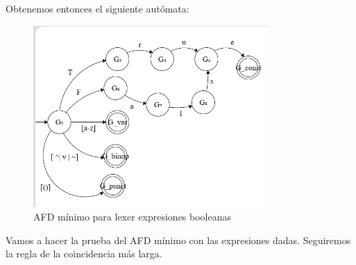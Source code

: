 Obtenemos entonces el siguiente autómata:

\begin{figure}[h!]
    \centering
    \includegraphics[width=0.8\textwidth]{images/ej10-3.jpeg}
    \caption{AFD mínimo para lexer expresiones booleanas}
    \label{fig:my_label}
\end{figure}


Vamos a hacer la prueba del AFD mínimo con las expresiones dadas. Seguiremos la regla de la coincidencia más larga.

